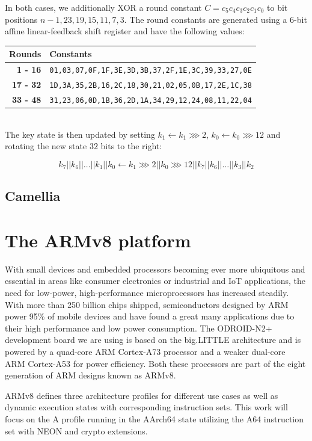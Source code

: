In both cases, we additionally XOR a round constant $C=c_5c_4c_3c_2c_1c_0$ to
bit positions $n-1,23,19,15,11,7,3$. The round constants are generated using a
6-bit affine linear-feedback shift register and have the following values:\\

\begin{tabular}{r|l}
    \textbf{Rounds} & \textbf{Constants} \\
    \hline
    \textbf{1 - 16} &  \small\texttt{01,03,07,0F,1F,3E,3D,3B,37,2F,1E,3C,39,33,27,0E} \\
    \textbf{17 - 32} & \small\texttt{1D,3A,35,2B,16,2C,18,30,21,02,05,0B,17,2E,1C,38} \\
    \textbf{33 - 48} & \small\texttt{31,23,06,0D,1B,36,2D,1A,34,29,12,24,08,11,22,04}
\end{tabular}\\

The key state is then updated by setting $k_1\leftarrow k_1\ggg 2$,
$k_0\leftarrow k_0\ggg 12$ and rotating the new state $32$ bits to the right:

\[
    k_7||k_6||\dots||k_1||k_0\leftarrow k_1\ggg 2||k_0\ggg 12||k_7||k_6||\dots||k_3||k_2
\]

\subsection{Camellia}

\section{The ARMv8 platform}

With small devices and embedded processors becoming ever more ubiquitous and
essential in areas like consumer electronics or industrial and IoT
applications, the need for low-power, high-performance microprocessors has
increased steadily. With more than 250 billion chips shipped, semiconductors
designed by ARM power 95\% of mobile devices and have found a great many
applications due to their high performance and low power consumption. The
ODROID-N2+\cite{odroidn2} development board we are using is based on the big.LITTLE
architecture and is powered by a quad-core ARM Cortex-A73 processor and a
weaker dual-core ARM Cortex-A53 for power efficiency. Both these processors are
part of the eight generation of ARM designs known as ARMv8\cite{armv8:2013}.

ARMv8 defines three architecture profiles for different use cases as well as
dynamic execution states with corresponding instruction sets. This work will
focus on the A profile running in the AArch64 state utilizing the A64
instruction set with NEON and crypto extensions.

